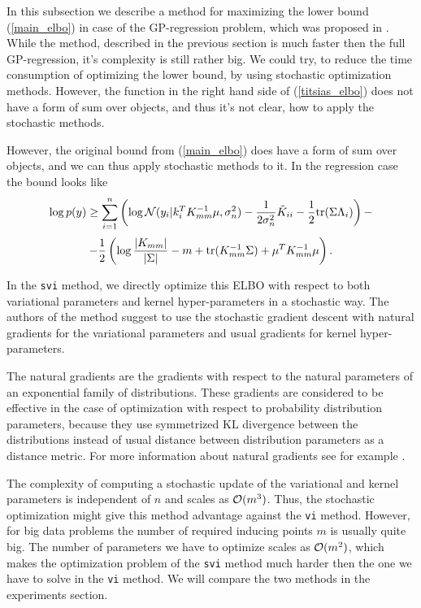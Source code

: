 In this subsection we describe a method for maximizing the lower bound (\ref{main_elbo}) in case of the GP-regression problem, which was proposed in \cite{BigData}. While the method, described in the previous section is much faster then the full GP-regression, it's complexity is still rather big. We could try, to reduce the time consumption of optimizing the lower bound, by using stochastic optimization methods. However, the function in the right hand side of (\ref{titsias_elbo}) does not have a form of sum over objects, and thus it's not clear, how to apply the stochastic methods.

However, the original bound from (\ref{main_elbo}) does have a form of sum over objects, and we can thus apply stochastic methods to it. In the regression case the bound looks like
$$\log p(y) \ge \sum_{i = 1}^{n} \left( \log \mathcal{N}(y_i | k_i^T K_{mm}^{-1} \mu, \sigma_n^2) - \frac 1 {2 \sigma_n^2} \tilde K_{ii} - \frac 1 2 \mbox{tr} (\Sigma \Lambda_i) \right) - $$
$$ -\frac 1 2 \left (\log \frac {|K_{mm}|} {|\Sigma|} - m + \mbox{tr}(K_{mm}^{-1} \Sigma) + \mu^T K_{mm}^{-1} \mu \right).$$

In the \lstinline{svi} method, we directly optimize this ELBO with respect to both variational parameters and kernel hyper-parameters in a stochastic way. The authors of the method suggest to use the stochastic gradient descent with natural gradients for the variational parameters and usual gradients for kernel hyper-parameters.

The natural gradients are the gradients with respect to the natural parameters of an exponential family of distributions. These gradients are considered to be effective in the case of optimization with respect to probability distribution parameters, because they use symmetrized $\mbox{KL}$ divergence between the distributions instead of usual distance between distribution parameters as a distance metric. For more information about natural gradients see for example \cite{ExpFamilyGeom}.

The complexity of computing a stochastic update of the variational and kernel parameters is independent of $n$ and scales as $\mathcal{O}(m^3)$. Thus, the stochastic optimization might give this method advantage against the \lstinline{vi} method. However, for big data problems the number of required inducing points $m$ is usually quite big. The number of parameters we have to optimize scales as $\mathcal{O}(m^2)$, which makes the optimization problem of the \lstinline{svi} method much harder then the one we have to solve in the \lstinline{vi} method. We will compare the two methods in the experiments section.
